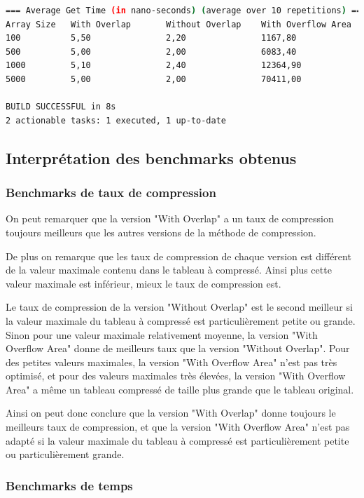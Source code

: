 \documentclass[titlepage]{article}
\begin{document}
\begin{lstlisting}[language=Bash]
=== Average Get Time (in nano-seconds) (average over 10 repetitions) ===
Array Size   With Overlap       Without Overlap    With Overflow Area
100          5,50               2,20               1167,80           
500          5,00               2,00               6083,40           
1000         5,10               2,40               12364,90          
5000         5,00               2,00               70411,00          

BUILD SUCCESSFUL in 8s
2 actionable tasks: 1 executed, 1 up-to-date
\end{lstlisting} 

\subsection{Interprétation des benchmarks obtenus}

\subsubsection{Benchmarks de taux de compression}

On peut remarquer que la version "With Overlap" a un taux de compression toujours meilleurs que les autres versions de la méthode de compression.
\par De plus on remarque que les taux de compression de chaque version est différent de la valeur maximale contenu dans le tableau à compressé. Ainsi plus cette valeur maximale est inférieur, mieux le taux de compression est.
\par Le taux de compression de la version "Without Overlap" est le second meilleur si la valeur maximale du tableau à compressé est particulièrement petite ou grande. Sinon pour une valeur maximale relativement moyenne, la version "With Overflow Area" donne de meilleurs taux que la version "Without Overlap". Pour des petites valeurs maximales, la version "With Overflow Area" n'est pas très optimisé, et pour des valeurs maximales très élevées, la version "With Overflow Area" a même un tableau compressé de taille plus grande que le tableau original.
\par Ainsi on peut donc conclure que la version "With Overlap" donne toujours le meilleurs taux de compression, et que la version "With Overflow Area" n'est pas adapté si la valeur maximale du tableau à compressé est particulièrement petite ou particulièrement grande. 


\subsubsection{Benchmarks de temps}
\end{document}
